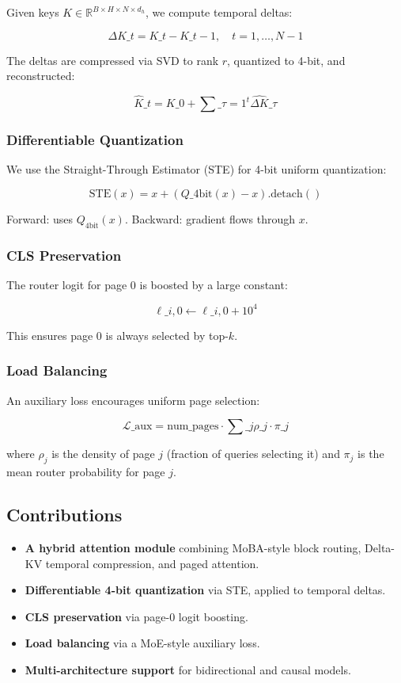Given keys $K \in \mathbb{R}^{B \times H \times N \times d_h}$, we compute 
temporal deltas:

\[
\Delta K\_t = K\_t - K\_{t-1}, \quad t = 1, \dots, N-1
\tag{1.3}
\]

The deltas are compressed via SVD to rank $r$, quantized to 4-bit, and 
reconstructed:

\[
\hat{K}\_t = K\_0 + \sum\_{\tau=1}^t \widehat{\Delta K}\_\tau
\tag{1.4}
\]

\subsubsection{Differentiable Quantization}

We use the Straight-Through Estimator (STE) for 4-bit uniform quantization:

\[
\text{STE}(x) = x + (Q\_{4\text{bit}}(x) - x).\text{detach}()
\tag{1.5}
\]

Forward: uses $Q_{4\text{bit}}(x)$. Backward: gradient flows through $x$.

\subsubsection{CLS Preservation}

The router logit for page 0 is boosted by a large constant:

\[
\ell\_{i, 0} \leftarrow \ell\_{i, 0} + 10^4
\tag{1.6}
\]

This ensures page 0 is always selected by top-$k$.

\subsubsection{Load Balancing}

An auxiliary loss encourages uniform page selection:

\[
\mathcal{L}\_\text{aux} = \text{num\_pages} \cdot \sum\_{j} \rho\_j \cdot \pi\_j
\tag{1.7}
\]

where $\rho_j$ is the density of page $j$ (fraction of queries selecting it) 
and $\pi_j$ is the mean router probability for page $j$.

\subsection{Contributions}

\begin{itemize}
\item \textbf{A hybrid attention module} combining MoBA-style block routing, Delta-KV
  temporal compression, and paged attention.
\item \textbf{Differentiable 4-bit quantization} via STE, applied to temporal deltas.
\item \textbf{CLS preservation} via page-0 logit boosting.
\item \textbf{Load balancing} via a MoE-style auxiliary loss.
\item \textbf{Multi-architecture support} for bidirectional and causal models.

\end{itemize}
